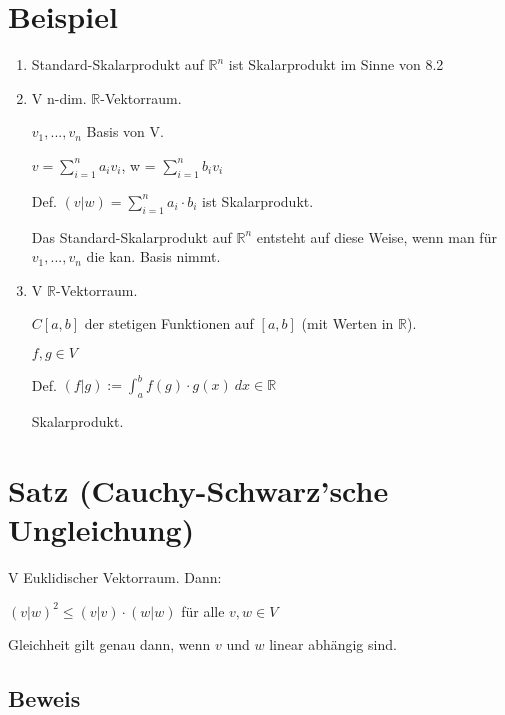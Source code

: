 \documentclass[a4paper, openany]{book}
\begin{document}
        \section{Beispiel}

        \begin{enumerate}[label=(\alph*)]
          \item Standard-Skalarprodukt auf $\mathbb{R}^n$ ist Skalarprodukt im Sinne von 8.2

          \item V n-dim. $\mathbb{R}$-Vektorraum.

          $v_1, ..., v_n$ Basis von V.

          $v = \sum_{i=1}^n a_iv_i$, w = $\sum_{i=1}^n b_iv_i$

          Def. $(v|w) = \sum_{i=1}^n a_i \cdot b_i$ ist Skalarprodukt.

          Das Standard-Skalarprodukt auf $\mathbb{R}^n$ entsteht auf diese Weise, wenn man für $v_1, ..., v_n$ die kan. Basis nimmt.

          \item V $\mathbb{R}$-Vektorraum.

          $C[a,b]$ der stetigen Funktionen auf $[a,b]$ (mit Werten in $\mathbb{R}$).

          \par \medskip

          $f,g \in V$

          Def. $(f|g) := \int_{a}^b f(g) \cdot g(x) \ dx \in \mathbb{R}$

          Skalarprodukt.
        \end{enumerate}

        \section{Satz (Cauchy-Schwarz'sche Ungleichung)}

        V Euklidischer Vektorraum. Dann:

        \begin{center}
          $(v|w)^2 \le (v|v) \cdot (w|w)$ für alle $v,w \in V$
        \end{center}

        Gleichheit gilt genau dann, wenn $v$ und $w$ linear abhängig sind.

        \subsection{Beweis}
\end{document}
